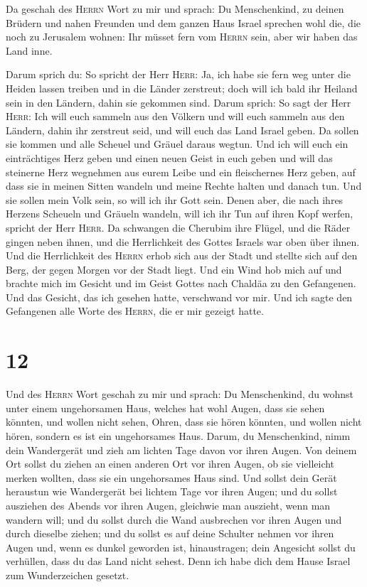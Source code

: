  Da geschah des \textsc{Herrn} Wort zu mir und sprach:
 Du Menschenkind, zu deinen Brüdern und nahen Freunden
und dem ganzen Haus Israel sprechen wohl die, die noch zu Jerusalem
wohnen: Ihr müsset fern vom \textsc{Herrn} sein, aber wir haben das Land
inne.

 Darum sprich du: So spricht der Herr \textsc{Herr}: Ja,
ich habe sie fern weg unter die Heiden lassen treiben und in die Länder
zerstreut; doch will ich bald ihr Heiland sein in den Ländern, dahin sie
gekommen sind.  Darum sprich: So sagt der Herr
\textsc{Herr}: Ich will euch sammeln aus den Völkern und will euch
sammeln aus den Ländern, dahin ihr zerstreut seid, und will euch das
Land Israel geben.  Da sollen sie kommen und alle Scheuel
und Gräuel daraus wegtun.  Und ich will euch ein
einträchtiges Herz geben und einen neuen Geist in euch geben und will
das steinerne Herz wegnehmen aus eurem Leibe und ein fleischernes Herz
geben,  auf dass sie in meinen Sitten wandeln und meine
Rechte halten und danach tun. Und sie sollen mein Volk sein, so will ich
ihr Gott sein.  Denen aber, die nach ihres Herzens
Scheueln und Gräueln wandeln, will ich ihr Tun auf ihren Kopf werfen,
spricht der Herr \textsc{Herr}.  Da schwangen die
Cherubim ihre Flügel, und die Räder gingen neben ihnen, und die
Herrlichkeit des Gottes Israels war oben über ihnen.  Und
die Herrlichkeit des \textsc{Herrn} erhob sich aus der Stadt und stellte
sich auf den Berg, der gegen Morgen vor der Stadt liegt. 
Und ein Wind hob mich auf und brachte mich im Gesicht und im Geist
Gottes nach Chaldäa zu den Gefangenen. Und das Gesicht, das ich gesehen
hatte, verschwand vor mir.  Und ich sagte den Gefangenen
alle Worte des \textsc{Herrn}, die er mir gezeigt hatte.

\hypertarget{section-11}{%
\section{12}\label{section-11}}

 Und des \textsc{Herrn} Wort geschah zu mir und sprach:
 Du Menschenkind, du wohnst unter einem ungehorsamen Haus,
welches hat wohl Augen, dass sie sehen könnten, und wollen nicht sehen,
Ohren, dass sie hören könnten, und wollen nicht hören, sondern es ist
ein ungehorsames Haus.  Darum, du Menschenkind, nimm dein
Wandergerät und zieh am lichten Tage davon vor ihren Augen. Von deinem
Ort sollst du ziehen an einen anderen Ort vor ihren Augen, ob sie
vielleicht merken wollten, dass sie ein ungehorsames Haus sind.
 Und sollst dein Gerät heraustun wie Wandergerät bei
lichtem Tage vor ihren Augen; und du sollst ausziehen des Abends vor
ihren Augen, gleichwie man auszieht, wenn man wandern will;
 und du sollst durch die Wand ausbrechen vor ihren Augen
und durch dieselbe ziehen;  und du sollst es auf deine
Schulter nehmen vor ihren Augen und, wenn es dunkel geworden ist,
hinaustragen; dein Angesicht sollst du verhüllen, dass du das Land nicht
sehest. Denn ich habe dich dem Hause Israel zum Wunderzeichen gesetzt.

